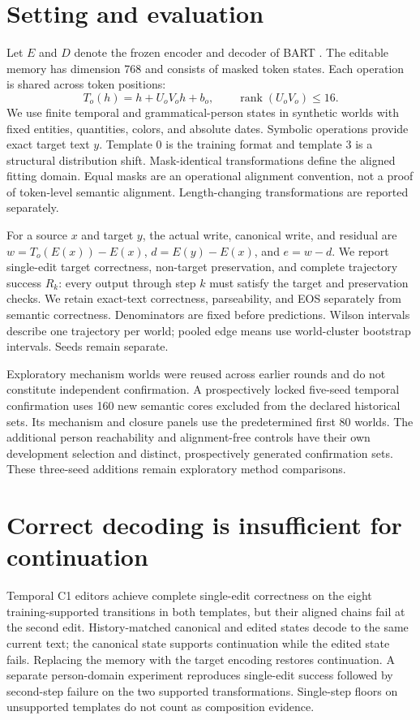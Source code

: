 \documentclass[11pt]{article}
\begin{document}
\section{Setting and evaluation}
Let $E$ and $D$ denote the frozen encoder and decoder of BART
\cite{lewis2019bart}. The editable memory has dimension 768 and consists of
masked token states. Each operation is shared across token positions:
\begin{equation}
 T_o(h)=h+U_oV_oh+b_o,\qquad \operatorname{rank}(U_oV_o)\leq16.
\end{equation}
We use finite temporal and grammatical-person states in synthetic worlds with
fixed entities, quantities, colors, and absolute dates. Symbolic operations
provide exact target text $y$. Template 0 is the training format and template 3
is a structural distribution shift. Mask-identical transformations define the
aligned fitting domain. Equal masks are an operational alignment convention,
not a proof of token-level semantic alignment. Length-changing transformations
are reported separately.

For a source $x$ and target $y$, the actual write, canonical write, and residual
are $w=T_o(E(x))-E(x)$, $d=E(y)-E(x)$, and $e=w-d$.
We report single-edit target correctness, non-target preservation, and complete
trajectory success $R_k$: every output through step $k$ must satisfy the target
and preservation checks. We retain exact-text correctness, parseability, and
EOS separately from semantic correctness. Denominators are fixed before
predictions. Wilson intervals describe one trajectory per world; pooled edge
means use world-cluster bootstrap intervals. Seeds remain separate.

Exploratory mechanism worlds were reused across earlier rounds and do not
constitute independent confirmation. A prospectively locked five-seed temporal
confirmation uses 160 new semantic cores excluded from the declared historical
sets. Its mechanism and closure panels use the predetermined first 80 worlds.
The additional person reachability and alignment-free controls have their own
development selection and distinct, prospectively generated confirmation sets.
These three-seed additions remain exploratory method comparisons.

\section{Correct decoding is insufficient for continuation}
Temporal C1 editors achieve complete single-edit correctness on the eight
training-supported transitions in both templates, but their aligned chains
fail at the second edit. History-matched canonical and edited states decode to
the same current text; the canonical state supports continuation while the
edited state fails. Replacing the memory with the target encoding restores
continuation. A separate person-domain experiment reproduces single-edit
success followed by second-step failure on the two supported transformations.
Single-step floors on unsupported templates do not count as composition
evidence.
\end{document}
